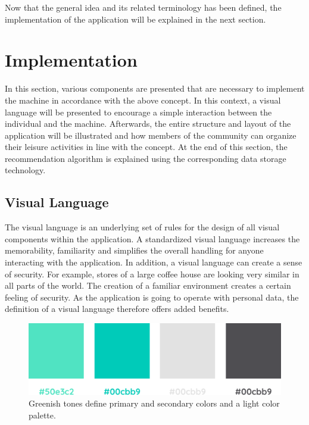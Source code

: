 \documentclass[12pt,numbers=noenddot,parskip,bibliography=totocnumbered,listof=totocnumbered]{scrreprt}
\begin{document}
Now that the general idea and its related terminology has been defined, the implementation of the application will be explained in the next section.

\section{Implementation}
In this section, various components are presented that are necessary to implement the machine in accordance with the above concept. In this context, a visual language will be presented to encourage a simple interaction between the individual and the machine. Afterwards, the entire structure and layout of the application will be illustrated and how members of the community can organize their leisure activities in line with the concept. At the end of this section, the recommendation algorithm is explained using the corresponding data storage technology.

\subsection{Visual Language} 
The visual language is an underlying set of rules for the design of all visual components within the application. A standardized visual language increases the memorability, familiarity and simplifies the overall handling for anyone interacting with the application. In addition, a visual language can create a sense of security. For example, stores of a large coffee house are looking very similar in all parts of the world. The creation of a familiar environment creates a certain feeling of security. As the application is going to operate with personal data, the definition of a visual language therefore offers added benefits.

\begin{figure}
\centering
\includegraphics[width=0.875\linewidth]{colors.png}
\caption[Color palette]{Greenish tones define primary and secondary colors and a light color palette.}
\label{colors}
\end{figure}
\end{document}
